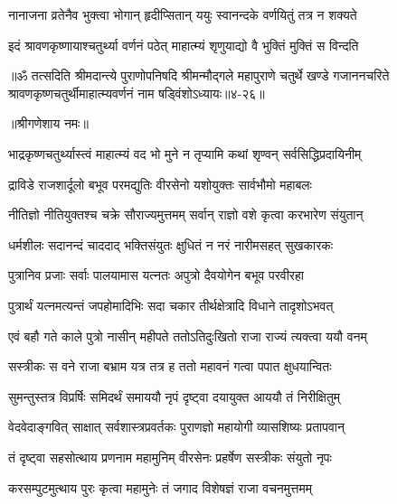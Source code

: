 \twolineshloka
{नानाजना व्रतेनैव भुक्त्वा भोगान् हृदीप्सितान्}
{ययुः स्वानन्दके वर्णयितुं तत्र न शक्यते} %

\twolineshloka
{इदं श्रावणकृष्णायाश्चतुर्थ्या वर्णनं पठेत्}
{माहात्म्यं श‍ृणुयाद्यो वै भुक्तिं मुक्तिं स विन्दति} %

॥ॐ तत्सदिति श्रीमदान्त्ये पुराणोपनिषदि श्रीमन्मौद्गले महापुराणे चतुर्थे खण्डे गजाननचरिते श्रावणकृष्णचतुर्थीमाहात्म्यवर्णनं नाम षड्विंशोऽध्यायः॥४-२६॥


\label{sec:bhadrapada-krishna-chaturthi-mahatmya-varnanam}

\centerline{॥श्रीगणेशाय नमः॥}


\twolineshloka
{भाद्रकृष्णचतुर्थ्यास्त्वं माहात्म्यं वद भो मुने}
{न तृप्यामि कथां श‍ृण्वन् सर्वसिद्धिप्रदायिनीम्} %


\twolineshloka
{द्राविडे राजशार्दूलो बभूव परमद्युतिः}
{वीरसेनो यशोयुक्तः सार्वभौमो महाबलः} %

\twolineshloka
{नीतिज्ञो नीतियुक्तश्च चक्रे सौराज्यमुत्तमम्}
{सर्वान् राज्ञो वशे कृत्वा करभारेण संयुतान्} %

\twolineshloka
{धर्मशीलः सदानन्दं चाददाद् भक्तिसंयुतः}
{क्षुधितं न नरं नारीमसहत् सुखकारकः} %

\twolineshloka
{पुत्रानिव प्रजाः सर्वाः पालयामास यत्नतः}
{अपुत्रो दैवयोगेन बभूव परवीरहा} %

\twolineshloka
{पुत्रार्थं यत्नमत्यन्तं जपहोमादिभिः सदा}
{चकार तीर्थक्षेत्रादि विधाने तादृशोऽभवत्} %

\twolineshloka
{एवं बहौ गते काले पुत्रो नासीन् महीपते}
{ततोऽतिदुःखितो राजा राज्यं त्यक्त्वा ययौ वनम्} %

\twolineshloka
{सस्त्रीकः स वने राजा बभ्राम यत्र तत्र ह}
{ततो महावनं गत्वा पपात क्षुधयान्वितः} %

\twolineshloka
{सुमन्तुस्तत्र विप्रर्षिः समिदर्थं समाययौ}
{नृपं दृष्ट्वा दयायुक्त आययौ तं निरीक्षितुम्} %

\twolineshloka
{वेदवेदाङ्गवित् साक्षात् सर्वशास्त्रप्रवर्तकः}
{पुराणज्ञो महायोगी व्यासशिष्यः प्रतापवान्} %

\twolineshloka
{तं दृष्ट्वा सहसोत्थाय प्रणनाम महामुनिम्}
{वीरसेनः प्रहर्षेण सस्त्रीकः संयुतो नृपः} %

\twolineshloka
{करसम्पुटमुत्थाय पुरः कृत्वा महामुनेः}
{तं जगाद विशेषज्ञं राजा वचनमुत्तमम्} %


